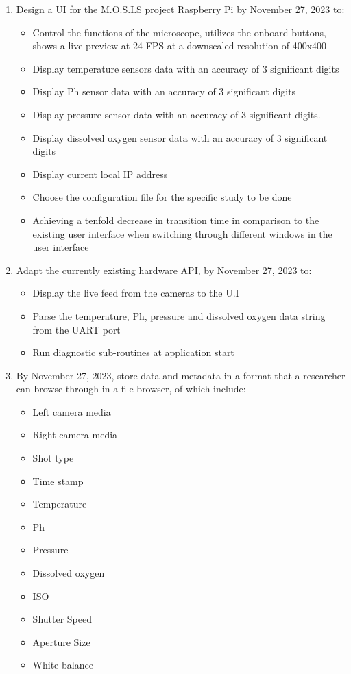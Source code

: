 \begin{enumerate}
	\item Design a UI for the M.O.S.I.S project Raspberry Pi by November 27, 2023 to:
	      \begin{itemize}
		      \item Control the functions of the microscope, utilizes the onboard buttons, shows a live preview at 24 FPS at a downscaled resolution of 400x400
		      \item Display temperature sensors data with an accuracy of 3 significant digits
		      \item Display Ph sensor data with an accuracy of 3 significant digits
		      \item Display pressure sensor data with an accuracy of 3 significant digits.
		      \item Display dissolved oxygen sensor data with an accuracy of 3 significant digits
		      \item Display current local IP address
		      \item Choose the configuration file for the specific study to be done
		      \item Achieving a tenfold decrease in transition time in comparison to the existing user interface when switching through different windows in the user interface
	      \end{itemize}
	\item Adapt the currently existing hardware API, by November 27, 2023 to:
	      \begin{itemize}
		      \item Display the live feed from the cameras to the U.I
		      \item Parse the temperature, Ph, pressure and dissolved oxygen data string from the UART port
		      \item Run diagnostic sub-routines at application start
	      \end{itemize}
	\item By November 27, 2023, store data and metadata in a format that a researcher can browse through in a file browser, of which include:
	      \begin{itemize}
		      \item Left camera media
		      \item Right camera media
		      \item Shot type
		      \item Time stamp
		      \item Temperature
		      \item Ph
		      \item Pressure
		      \item Dissolved oxygen
                      \item ISO
                      \item Shutter Speed
                      \item Aperture Size
                      \item White balance
	      \end{itemize}
\end{enumerate}
